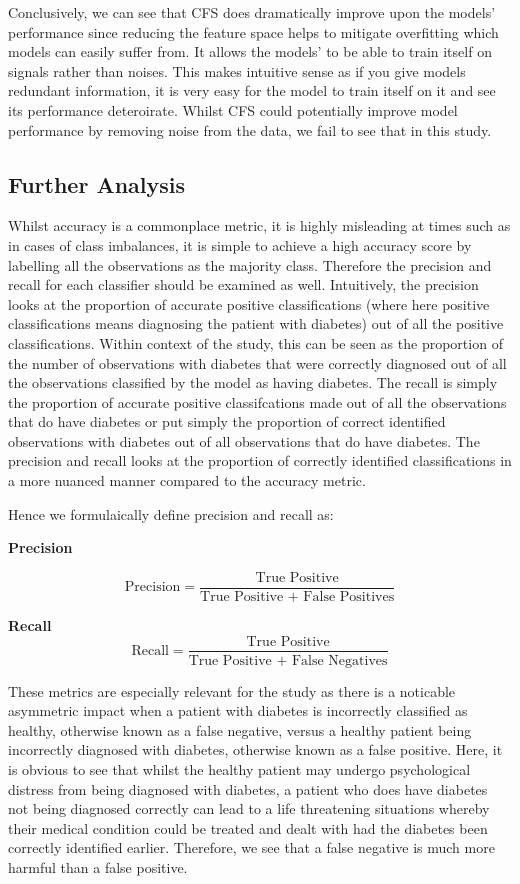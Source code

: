 \documentclass[12pt]{article}
\begin{document}
Conclusively, we can see that CFS does dramatically improve upon the models' performance since reducing the feature space helps to mitigate overfitting which models can easily suffer from. It allows the models' to be able to train itself on signals rather than noises. This makes intuitive sense as if you give models redundant information, it is very easy for the model to train itself on it and see its performance deteroirate. Whilst CFS could potentially improve model performance by removing noise from the data, we fail to see that in this study.

\subsection*{Further Analysis}

Whilst accuracy is a commonplace metric, it is highly misleading at times such as in cases of class imbalances, it is simple to achieve a high accuracy score by labelling all the observations as the majority class. Therefore the precision and recall for each classifier should be examined as well. Intuitively, the precision looks at the proportion of accurate positive classifications (where here positive classifications means diagnosing the patient with diabetes) out of all the positive classifications. Within context of the study, this can be seen as the proportion of the number of observations with diabetes that were correctly diagnosed out of all the observations classified by the model as having diabetes. The recall is simply the proportion of accurate positive classifcations made out of all the observations that do have diabetes or put simply the proportion of correct identified observations with diabetes out of all observations that do have diabetes. The precision and recall looks at the proportion of correctly identified classifications in a more nuanced manner compared to the accuracy metric.

Hence we formulaically define precision and recall as:

\textbf{Precision}

$$
\text{Precision} = \frac{\text{True Positive}}{\text{True Positive + False Positives}}
$$

\textbf{Recall}
$$
\text{Recall} = \frac{\text{True Positive}}{\text{True Positive + False Negatives}}
$$

These metrics are especially relevant for the study as there is a noticable asymmetric impact when a patient with diabetes is incorrectly classified as healthy, otherwise known as a false negative, versus a healthy patient being incorrectly diagnosed with diabetes, otherwise known as a false positive. Here, it is obvious to see that whilst the healthy patient may undergo psychological distress from being diagnosed with diabetes, a patient who does have diabetes not being diagnosed correctly can lead to a life threatening situations whereby their medical condition could be treated and dealt with had the diabetes been correctly identified earlier. Therefore, we see that a false negative is much more harmful than a false positive.
\end{document}
